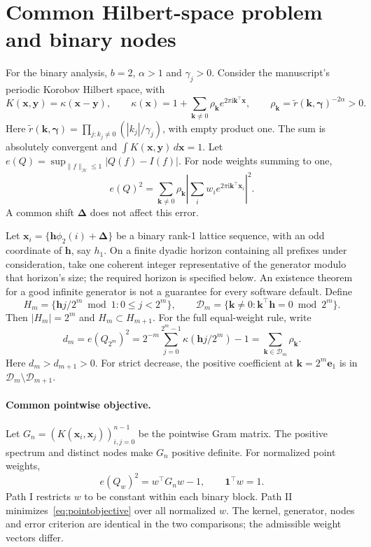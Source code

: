 \documentclass[11pt]{article}
\newcommand{\ii}{\mathrm{i}}
\newcommand{\bbone}{\boldsymbol{1}}
\newcommand{\bk}{\boldsymbol{k}}
\newcommand{\bh}{\boldsymbol{h}}
\newcommand{\bx}{\boldsymbol{x}}
\newcommand{\by}{\boldsymbol{y}}
\newcommand{\bDelta}{\boldsymbol{\Delta}}
\newcommand{\cH}{\mathcal H}
\begin{document}
\section{Common Hilbert-space problem and binary nodes}\label{sec:setup}
For the binary analysis, $b=2$, $\alpha>1$ and $\gamma_j>0$.
Consider the manuscript's periodic Korobov Hilbert space, with
\[
 K(\bx,\by)=\kappa(\bx-\by),\qquad
 \kappa(\bx)=1+\sum_{\bk\ne0}\rho_{\bk}
                e^{2\pi\ii\bk^\top\bx},\qquad
 \rho_{\bk}=\widetilde r(\bk,\boldsymbol{\gamma})^{-2\alpha}>0.
\]
Here $\widetilde r(\bk,\boldsymbol{\gamma})=\prod_{j:k_j\ne0}(|k_j|/\gamma_j)$,
with empty product one. The sum is absolutely convergent and $\int K(\bx,\by)\,d\bx=1$.
Let $e(Q)=\sup_{\|f\|_{\cH}\le1}|Q(f)-I(f)|$.
For node weights summing to one,
\begin{equation}\label{eq:fourier}
 e(Q)^2=\sum_{\bk\ne0}\rho_{\bk}
 \left|\sum_iw_i e^{2\pi\ii\bk^\top\bx_i}\right|^2.
\end{equation}
A common shift $\bDelta$ does not affect this error.

Let $\bx_i=\{\bh\phi_2(i)+\bDelta\}$ be a binary rank-1 lattice sequence,
with an odd coordinate of $\bh$, say $h_1$.
On a finite dyadic horizon containing all prefixes under consideration,
take one coherent integer representative of the generator modulo
that horizon's size; the required horizon is specified below.
An existence theorem for a good infinite generator is not a guarantee
for every software default.
Define
\[
 H_m=\{\bh j/2^m\bmod1:0\le j<2^m\},\qquad
 \mathcal D_m=\{\bk\ne0:\bk^\top\bh=0\bmod2^m\}.
\]
Then $|H_m|=2^m$ and $H_m\subset H_{m+1}$.
For the full equal-weight rule, write
\begin{equation}\label{eq:dm}
 d_m=e(Q_{2^m})^2
 =2^{-m}\sum_{j=0}^{2^m-1}\kappa(\bh j/2^m)-1
 =\sum_{\bk\in\mathcal D_m}\rho_{\bk}.
\end{equation}
Here $d_m>d_{m+1}>0$. For strict decrease, the positive coefficient
at $\bk=2^m\boldsymbol e_1$ is in
$\mathcal D_m\setminus\mathcal D_{m+1}$.

\paragraph{Common pointwise objective.}
Let $G_n=(K(\bx_i,\bx_j))_{i,j=0}^{n-1}$ be the pointwise Gram
matrix. The positive spectrum and distinct nodes make $G_n$ positive
definite. For normalized point weights,
\begin{equation}\label{eq:pointobjective}
 e(Q_w)^2=w^\top G_nw-1,\qquad \bbone^\top w=1.
\end{equation}
Path I restricts $w$ to be constant within each binary block.
Path II minimizes~\eqref{eq:pointobjective} over all normalized $w$.
The kernel, generator, nodes and error criterion are identical in
the two comparisons; the admissible weight vectors differ.
\end{document}

